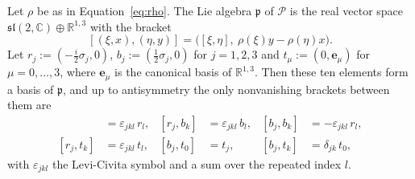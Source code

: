 	\begin{proposition}\label{prop:poincare-algebra}
		Let $\rho$ be as in Equation~\eqref{eq:rho}. The Lie algebra $\mathfrak{p}$ of $\mathcal{P}$ is the real vector space $\mathfrak{sl}(2,\mathbb{C})\oplus\mathbb{R}^{1,3}$ with the bracket
		\begin{equation}\label{eq:poincare-bracket}
			[(\xi,x),(\eta,y)]=\big([\xi,\eta],\ \rho(\xi)y-\rho(\eta)x\big).
		\end{equation}
		Let $r_j:=(-\tfrac i2\sigma_j,0)$, $b_j:=(\tfrac12\sigma_j,0)$ for $j=1,2,3$ and $t_\mu:=(0,\mathbf{e}_\mu)$ for $\mu=0,\dots,3$, where $\mathbf{e}_\mu$ is the canonical basis of $\mathbb{R}^{1,3}$. Then these ten elements form a basis of $\mathfrak{p}$, and up to antisymmetry the only nonvanishing brackets between them are
		\begin{align}
			[r_j,r_k]&=\varepsilon_{jkl}\,r_l, & [r_j,b_k]&=\varepsilon_{jkl}\,b_l, & [b_j,b_k]&=-\varepsilon_{jkl}\,r_l,\label{eq:lorentz-algebra}\\
			[r_j,t_k]&=\varepsilon_{jkl}\,t_l, & [b_j,t_0]&=t_j, & [b_j,t_k]&=\delta_{jk}\,t_0,\label{eq:translation-action}
		\end{align}
		with $\varepsilon_{jkl}$ the Levi-Civita symbol and a sum over the repeated index $l$.
	\end{proposition}
	
